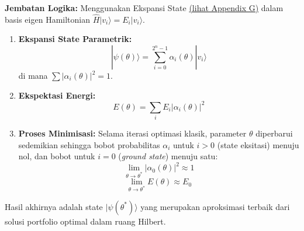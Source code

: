 \textbf{Jembatan Logika:} Menggunakan Ekspansi State \hyperref[appendix-g]{(lihat Appendix G)} dalam basis eigen Hamiltonian \(\hat{H} |v_i\rangle = E_i |v_i\rangle\).

\begin{enumerate}
\def\labelenumi{\arabic{enumi}.}
\item
  \textbf{Ekspansi State Parametrik:} \[ |\psi(\theta)\rangle = \sum_{i=0}^{2^n-1} \alpha_i(\theta) |v_i\rangle \] di mana \(\sum |\alpha_i(\theta)|^2 = 1\).
\item
  \textbf{Ekspektasi Energi:} \[ E(\theta) = \sum_i E_i |\alpha_i(\theta)|^2 \]
\item
  \textbf{Proses Minimisasi:} Selama iterasi optimasi klasik, parameter \(\theta\) diperbarui sedemikian sehingga bobot probabilitas \(\alpha_i\) untuk \(i > 0\) (state eksitasi) menuju nol, dan bobot untuk \(i=0\) (\emph{ground state}) menuju satu: \[ \lim_{\theta \to \theta^*} |\alpha_0(\theta)|^2 \approx 1 \] \[ \lim_{\theta \to \theta^*} E(\theta) \approx E_0 \]
\end{enumerate}

Hasil akhirnya adalah state \(|\psi(\theta^*)\rangle\) yang merupakan aproksimasi terbaik dari solusi portfolio optimal dalam ruang Hilbert.


